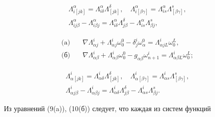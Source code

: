 \begin{gather*} 


\Lambda^\alpha_{i[j k]}=\Lambda^\alpha_{i\delta} 


\Lambda^\delta_{[j k]},\quad \Lambda^\alpha_{i[\beta\gamma]}= 


\Lambda^\alpha_{is}\Lambda^s_{[\beta\gamma]},\\ 


\Lambda^\alpha_{i j\beta}-\Lambda^\alpha_{i\beta j}= 


\Lambda^\alpha_{i\delta}\Lambda^\delta_{j\beta}- 


\Lambda^\alpha_{is}\Lambda^s_{\beta j}, 


\end{gather*} 


\begin{equation} 


\begin{split} 


\text{(a)} \quad & \nabla\Lambda^i_{\alpha j}+ 


\Lambda^i_{\alpha j}\omega^0_0-\delta^i_j\omega^0_\alpha= 


\Lambda^i_{\alpha j L}\omega^L_0,\\ 


\text{(б)} \quad & \nabla\Lambda^i_{\alpha\beta}+ 


\Lambda^i_{\alpha\beta}\omega^0_0-g_{\alpha\beta} 


\omega^i_{n+1}=\Lambda^i_{\alpha\beta L}\omega^L_0; 


\end{split} 


\end{equation} 


\begin{gather*} 


\Lambda^i_{\alpha[j k]}=\Lambda^i_{\alpha\delta} 


\Lambda^\delta_{[j k]},\quad \Lambda^i_{\alpha[\beta\gamma]}= 


\Lambda^i_{\alpha s}\Lambda^s_{[\beta\gamma]},\\ 


\Lambda^i_{\alpha j\beta}-\Lambda^i_{\alpha\beta j}= 


\Lambda^i_{\alpha\delta}\Lambda^\delta_{j\beta}- 


\Lambda^i_{\alpha s}\Lambda^s_{\beta j}. 


\end{gather*} 


Из уравнений (9(a)), (10(б)) следует, что каждая из систем функций 


